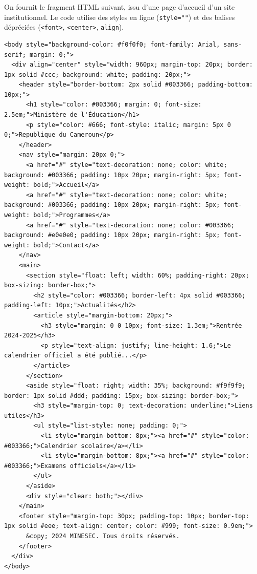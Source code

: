 \documentclass[11pt]{article}
\begin{document}
\begin{exercice}
On fournit le fragment HTML suivant, issu d'une page d'accueil d'un site institutionnel. Le code utilise des styles en ligne (\texttt{style=""}) et des balises dépréciées (\texttt{<font>}, \texttt{<center>}, \texttt{align}).

\begin{verbatim}
<body style="background-color: #f0f0f0; font-family: Arial, sans-serif; margin: 0;">
  <div align="center" style="width: 960px; margin-top: 20px; border: 1px solid #ccc; background: white; padding: 20px;">
    <header style="border-bottom: 2px solid #003366; padding-bottom: 10px;">
      <h1 style="color: #003366; margin: 0; font-size: 2.5em;">Ministère de l'Éducation</h1>
      <p style="color: #666; font-style: italic; margin: 5px 0 0;">Republique du Cameroun</p>
    </header>
    <nav style="margin: 20px 0;">
      <a href="#" style="text-decoration: none; color: white; background: #003366; padding: 10px 20px; margin-right: 5px; font-weight: bold;">Accueil</a>
      <a href="#" style="text-decoration: none; color: white; background: #003366; padding: 10px 20px; margin-right: 5px; font-weight: bold;">Programmes</a>
      <a href="#" style="text-decoration: none; color: #003366; background: #e0e0e0; padding: 10px 20px; margin-right: 5px; font-weight: bold;">Contact</a>
    </nav>
    <main>
      <section style="float: left; width: 60%; padding-right: 20px; box-sizing: border-box;">
        <h2 style="color: #003366; border-left: 4px solid #003366; padding-left: 10px;">Actualités</h2>
        <article style="margin-bottom: 20px;">
          <h3 style="margin: 0 0 10px; font-size: 1.3em;">Rentrée 2024-2025</h3>
          <p style="text-align: justify; line-height: 1.6;">Le calendrier officiel a été publié...</p>
        </article>
      </section>
      <aside style="float: right; width: 35%; background: #f9f9f9; border: 1px solid #ddd; padding: 15px; box-sizing: border-box;">
        <h3 style="margin-top: 0; text-decoration: underline;">Liens utiles</h3>
        <ul style="list-style: none; padding: 0;">
          <li style="margin-bottom: 8px;"><a href="#" style="color: #003366;">Calendrier scolaire</a></li>
          <li style="margin-bottom: 8px;"><a href="#" style="color: #003366;">Examens officiels</a></li>
        </ul>
      </aside>
      <div style="clear: both;"></div>
    </main>
    <footer style="margin-top: 30px; padding-top: 10px; border-top: 1px solid #eee; text-align: center; color: #999; font-size: 0.9em;">
      &copy; 2024 MINESEC. Tous droits réservés.
    </footer>
  </div>
</body>
\end{verbatim}


\end{exercice}
\end{document}
